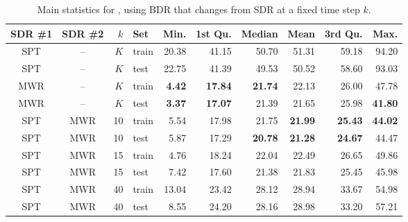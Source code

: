 \begin{table}[b]
\caption{Main statistics for  \namerho, using BDR that changes 
from SDR at a fixed time step $k$.}\label{tbl:BDR:stats} 
\centering
\begin{tabular}{ccrlrrrrrr}
  \toprule
  SDR \#1 & SDR \#2 & $k$ & Set & Min. & 1st Qu. & Median & Mean & 
    3rd Qu. & Max. \\ \midrule
  SPT & -- & $K$ & train & 20.38 & 41.15 & 50.70 & 51.31 & 59.18 & 94.20 \\ 
  SPT & -- & $K$ & test & 22.75 & 41.39 & 49.53 & 50.52 & 58.60 & 93.03 \\ 
  MWR & -- & $K$ & train & \textbf{4.42} & \textbf{17.84} & \textbf{21.74} & 
  22.13 & 26.00 & 47.78 \\ 
  MWR & -- & $K$ & test & \textbf{3.37} & \textbf{17.07} & 21.39 & 21.65 & 
  25.98 & \textbf{41.80} \\ 
  SPT & MWR & 10 & train & 5.54 & 17.98 & 21.75 & \textbf{21.99} & 
  \textbf{25.43} & \textbf{44.02} \\ 
  SPT & MWR & 10 & test & 5.87 & 17.29 & \textbf{20.78} & \textbf{21.28} & 
  \textbf{24.67} & 44.47 \\ 
  SPT & MWR & 15 & train & 4.76 & 18.24 & 22.04 & 22.49 & 26.65 & 49.86 \\ 
  SPT & MWR & 15 & test & 7.42 & 17.60 & 21.38 & 21.83 & 25.45 & 45.98 \\ 
  SPT & MWR & 40 & train & 13.04 & 23.42 & 28.12 & 28.94 & 33.67 & 54.98 \\ 
  SPT & MWR & 40 & test & 8.55 & 24.20 & 28.16 & 28.98 & 33.20 & 57.21 \\ 
  \bottomrule
\end{tabular}
\end{table}